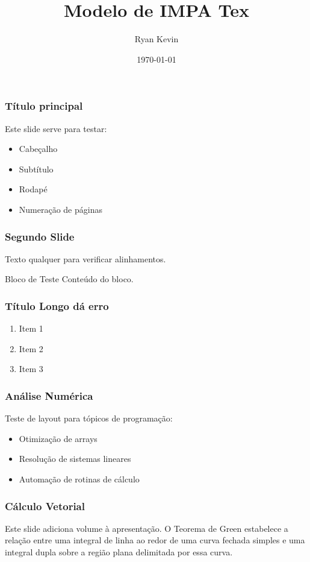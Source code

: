 \documentclass[aspectratio=169]{beamer}
\title[IMPA Tex]{Modelo de IMPA Tex}
\author[Ryan Kevin]{Ryan Kevin}
\institute[IMPATECH]{Instituto de Matemática, Pesquisa e Tecnologia}
\date{\today}
\begin{document}
\begin{frame}
    \frametitle{Título principal}

    Este slide serve para testar:

    \begin{itemize}
        \item Cabeçalho
        \item Subtítulo
        \item Rodapé
        \item Numeração de páginas
    \end{itemize}
\end{frame}

\begin{frame}
    \frametitle{Segundo Slide}

    Texto qualquer para verificar alinhamentos.

    \vspace{1cm}

    \begin{block}{Bloco de Teste}
        Conteúdo do bloco.
    \end{block}
\end{frame}

\begin{frame}
    \frametitle{Título Longo dá erro}

    \begin{enumerate}
        \item Item 1
        \item Item 2
        \item Item 3
    \end{enumerate}
\end{frame}

\begin{frame}
    \frametitle{Análise Numérica}
    
    Teste de layout para tópicos de programação:
    \begin{itemize}
        \item Otimização de arrays
        \item Resolução de sistemas lineares
        \item Automação de rotinas de cálculo
    \end{itemize}
\end{frame}

\begin{frame}
    \frametitle{Cálculo Vetorial}

    Este slide adiciona volume à apresentação. O Teorema de Green estabelece a relação entre uma integral de linha ao redor de uma curva fechada simples e uma integral dupla sobre a região plana delimitada por essa curva.
\end{frame}
\end{document}
